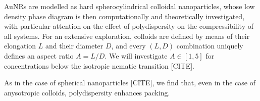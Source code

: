 \documentclass[journal=jacsat,manuscript=article]{achemso}
\begin{document}
AuNRs are modelled as  hard spherocylindrical colloidal nanoparticles, whose low density phase diagram is then computationally and theoretically investigated,  with particular attention on the effect of polydispersity on the compressibility of all systems. For an extensive exploration, colloids are defined by means of their elongation  $L$ and their diameter $D$, and every $(L,D)$ combination uniquely defines an aspect ratio $A=L/D$. We will  investigate $A \in [1,5]$ for concentrations below the isotropic nematic transition [CITE].


 As in the case of spherical nanoparticles [CITE], we find that, even in the case of anysotropic colloids,  polydispersity enhances packing. 
 
\end{document}
